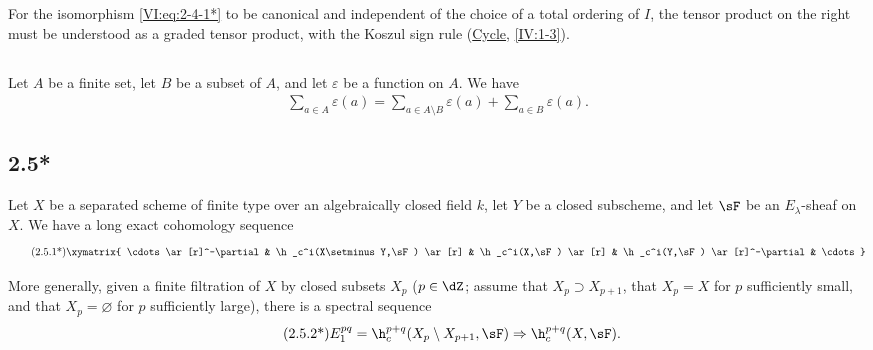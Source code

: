 For the isomorphism \eqref{VI:eq:2-4-1*} to be canonical and independent of 
the choice of a total ordering of $I$, the tensor product on the right must be 
understood as a graded tensor product, with the Koszul sign rule 
(\hyperref[IV]{Cycle}, \ref{IV:1-3}). 





\subsection{}\label{VI:2-5}

Let $A$ be a finite set, let $B$ be a subset of $A$, and let $\varepsilon$ be a 
function on $A$. We have 
\begin{align*}\tag{2.5.1}\label{VI:2-5-1}
  \sum_{a\in A} \varepsilon(a) = \sum_{a\in A\setminus B}\varepsilon(a) + \sum_{a\in B} \varepsilon(a) \text{.}
\end{align*}





\subsection*{2.5*}\label{VI:2-5*}

Let $X$ be a separated scheme of finite type over an algebraically closed field $k$, 
let $Y$ be a closed subscheme, and let $\sF$ be an $E_\lambda$-sheaf on $X$. We have 
a long exact cohomology sequence 
\begin{align*}\tag{2.5.1*}\label{VI:eq:2-5-1*}
\xymatrix{
  \cdots \ar[r]^-\partial 
    & \h_c^i(X\setminus Y,\sF) \ar[r] 
    & \h_c^i(X,\sF) \ar[r] 
    & \h_c^i(Y,\sF) \ar[r]^-\partial 
    & \cdots 
}
\end{align*}

More generally, given a finite filtration of $X$ by closed subsets 
$X_p$ ($p\in \dZ$; assume that $X_p\supset X_{p+1}$, that $X_p=X$ 
for $p$ sufficiently small, and that $X_p=\varnothing$ for $p$ sufficiently large), there is a 
spectral sequence 
\begin{align*}\tag{2.5.2*}\label{VI:eq:2-5-2*}
  E_1^{p q} = \h_c^{p+q}(X_p\setminus X_{p+1},\sF) \Rightarrow \h_c^{p+q}(X,\sF) \text{.}
\end{align*}





\subsection{}\label{VI:2-6}

